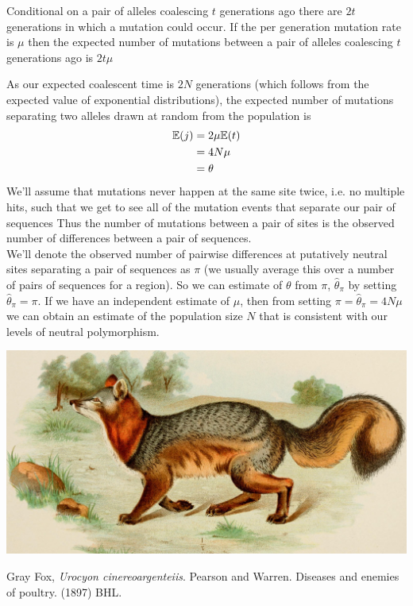 Conditional on a pair of alleles coalescing $t$ generations ago
there are $2t$ generations in which a mutation could occur. If the per
generation mutation rate is $\mu$ then the expected number of
mutations between a pair of alleles coalescing $t$ generations ago is
$2 t\mu$

As our expected coalescent time is $2N$ generations (which follows from the expected value of exponential distributions), the expected
number of mutations separating two alleles drawn at random from the
population is
%
\begin{align}
  \mathbb{E}(j) &= 2\mu\mathbb{E}(t) \\ \nonumber
  &= 4N\mu \\
  &= \theta \nonumber
\end{align}
We'll assume that mutations never happen at the same site twice,
i.e. no multiple hits, such that we get to see all of the mutation events that separate our pair
of sequences  Thus the number of
mutations between a pair of sites is the observed number of
differences between a pair of sequences. \\

We'll denote the observed number of pairwise differences at putatively neutral
sites separating a pair of sequences as $\pi$ (we usually average this over a
number of pairs of sequences for a region). So we can estimate of $\theta$ from
$\pi$, $\widehat{\theta}_{\pi}$ by setting $\widehat{\theta}_{\pi}=\pi$.  If we
have an independent estimate of $\mu$, then from setting $\pi =
\widehat{\theta}_{\pi} = 4N\mu$ we can obtain an estimate of the population
size $N$ that is consistent with our levels of neutral polymorphism.

\begin{marginfigure}
\begin{center}
  \includegraphics[width =
  \textwidth]{illustration_images/Quant_gen/Grey_fox/14770789583_4db7ec5164_o.jpg}  %
\end{center}
\caption{Gray Fox, {\it Urocyon cinereoargenteiis}. Pearson and Warren. Diseases and enemies of poultry. (1897) BHL.} 
\end{marginfigure}

